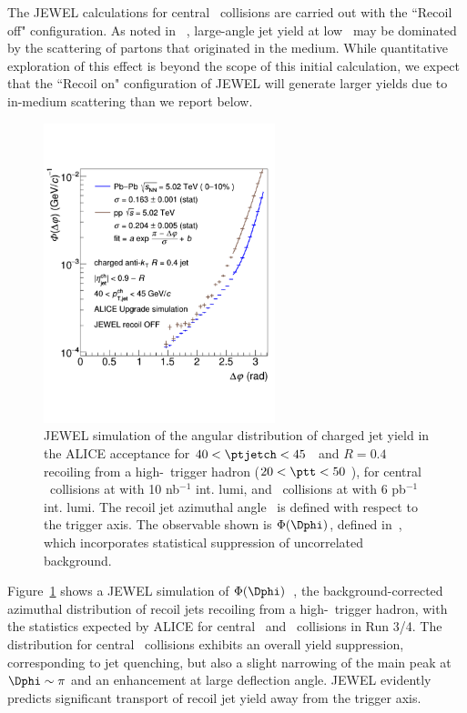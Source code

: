 The JEWEL calculations for central \PbPb\ collisions are carried out with the ``Recoil off" configuration. As noted in ~\cite{DEramo:2018eoy}, large-angle jet yield at low \ptjet\ may be dominated by the scattering of partons that originated in the medium. While quantitative exploration of this effect is beyond the scope of this initial calculation, we expect that the ``Recoil on" configuration of JEWEL will generate larger yields due to in-medium scattering than we report below.

\begin{figure}[tbh!]
\centering
\includegraphics[width=0.6\textwidth]{figures/jetdeflection/JetDeflectionFig_Phi.pdf}
\caption{JEWEL simulation of the angular distribution of charged jet yield in the ALICE acceptance for  $40<\ptjetch<45$ \gevc\ and $R=0.4$ recoiling from a high-\pt\ trigger hadron ($20<\ptt<50$ \gevc), for central \PbPb\ collisions at  with 10 nb$^{-1}$ int. lumi, and \pp\ collisions at  with 6 pb$^{-1}$ int. lumi. The recoil jet azimuthal angle \Dphi\ is defined with respect to the trigger axis. The observable shown is $\Phi(\Dphi)$, defined in~\cite{Adam:2015doa}, which incorporates statistical suppression of uncorrelated background.
}
\label{fig:JetDeflectionPhi}
\end{figure}

Figure~\ref{fig:JetDeflectionPhi} shows a JEWEL simulation of $\Phi(\Dphi)$~\cite{Adam:2015doa}, the background-corrected azimuthal distribution of recoil jets recoiling from a high-\pT\ trigger hadron, with the statistics expected by ALICE for central \PbPb\ and \pp\ collisions in Run 3/4. The distribution for central \PbPb\ collisions exhibits an overall yield suppression, corresponding to jet quenching, but also a slight narrowing of the main peak at $\Dphi\sim\pi$ and an enhancement at large deflection angle. JEWEL evidently predicts significant transport of recoil jet yield away from the trigger axis.

